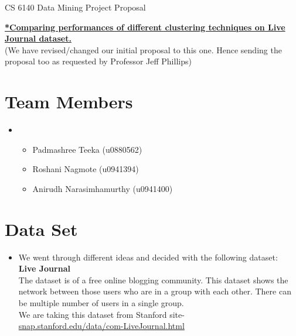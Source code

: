 \documentclass[11pt]{exam}
\begin{document}
\begingroup
\fontsize{14pt}{16pt}\selectfont
\begin{center}  
CS 6140 Data Mining Project Proposal \\

\end{center}  
\endgroup
\textbf{\underline{ *Comparing performances of different clustering techniques on Live Journal dataset. }} \\

(We have revised/changed our initial proposal to this one. Hence sending the proposal too as requested by Professor Jeff Phillips)

%
%



\section{Team Members}

\begin{itemize}
\item[]

\begin{itemize}
	\item Padmashree Teeka (u0880562)
	\item Roshani Nagmote (u0941394)
	\item Anirudh Narasimhamurthy (u0941400)
\end{itemize}

\end{itemize}
\section{Data Set}

\begin{itemize}
\item[] We went through different ideas and decided with the following dataset:\\
\textbf{Live Journal}\\
The dataset is of a free online blogging community. This dataset shows the network between those users who are in a group with each other. There can be multiple number of users in a single group. \\
We are taking this dataset from Stanford site-\\ \url{snap.stanford.edu/data/com-LiveJournal.html}

\end{itemize}
\end{document}
